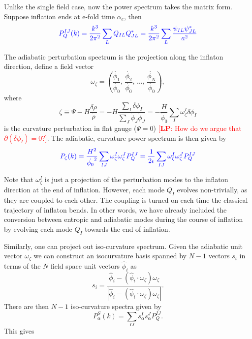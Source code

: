 \documentclass[11pt]{article}
\newcommand{\lp}[1]{\textcolor{red}{[{\bf LP}: #1]}}
\begin{document}
Unlike the single field case, now the power spectrum takes the matrix form. Suppose inflation ends at e-fold time $\alpha_e$, then
\begin{equation}
{\color{blue}
P_Q^{IJ} (k) = \frac{k^3}{2\pi^2} \sum_L Q_{IL}Q^*_{JL} =
\frac{k^3}{2\pi^2} \sum_L \frac{\psi_{IL}\psi^*_{JL}}{a^2}
}
\end{equation}

The adiabatic perturbation spectrum is the projection along the inflaton direction, define a field vector
\begin{equation}
\omega_\zeta = \left( \frac{\dot{\phi_1}}{\dot{\phi_0}},\, \frac{\dot{\phi_2}}{\dot{\phi_0}},\, \dots,\, \frac{\dot{\phi_N}}{\dot{\phi_0}} \right),
\end{equation}
where
\begin{equation}
  \zeta \equiv \Psi - H \frac{\delta \rho}{\dot \rho} = -H \frac{ \sum_I \delta \phi_I}{\sum_J \dot \phi_J \dot \phi_J} = -\frac{H}{\dot \phi_0}\sum_I \omega_\zeta^I \delta \phi_I
  \label{eqn:XXX}
\end{equation}
is the curvature perturbation in flat gauge ($\Psi=0$) \lp{How do we argue that $\partial(\delta \phi_I)=0$?}.  The adiabatic, curvature power spectrum is then given by
\begin{equation}
{\color{blue}
  P_\zeta(k) = \frac{H^2}{\dot{\phi_0}^2} \sum_{IJ} \omega_\zeta^I \omega_\zeta^J P_Q^{IJ} = \frac{1}{2 \epsilon} \sum_{IJ} \omega_\zeta^I \omega_\zeta^J P_Q^{IJ}
}
\end{equation}

Note that $\omega_\zeta^I$ is just a projection of the perturbation modes to the inflaton direction at the end of inflation. However, each mode $Q_I$ evolves non-trivially, as they are coupled to each other. The coupling is turned on each time the classical trajectory of inflaton bends. In other words, we have already included the conversion between entropic and adiabatic modes during the course of inflation by evolving each mode $Q_I$ towards the end of inflation. 

Similarly, one can project out iso-curvature spectrum.  Given the adiabatic unit vector $\omega_\zeta$ we can construct an isocurvature basis spanned by $N-1$ vectors $s_i$ in terms of the $N$ field space unit vectors $\hat \phi_i$ as
\begin{equation}
  s_i = \frac{\hat \phi_i - (\hat \phi_i \cdot \omega_\zeta) \omega_\zeta}{|\hat \phi_i - (\hat \phi_i \cdot \omega_\zeta) \omega_\zeta|}.
  \label{eqn:XXX}
\end{equation}
There are then $N-1$ iso-curvature spectra given by
\begin{equation}
  P_{\alpha}^S (k) = \sum_{IJ} s_\alpha^I s_\alpha^J P_Q^{IJ}.
\end{equation}
This gives 
\end{document}
